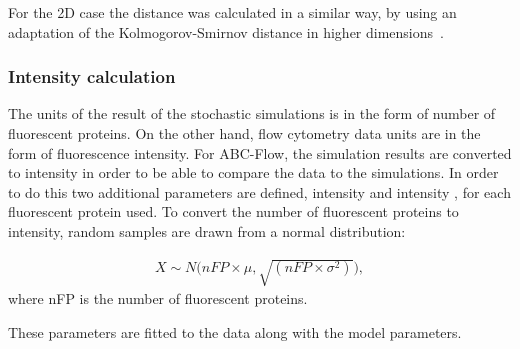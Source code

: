 

For the 2D case the distance was calculated in a similar way, by using an adaptation of the Kolmogorov-Smirnov distance in higher dimensions~\autocite{Peacock:1983fa}.

\clearpage
\subsubsection{Intensity calculation}

The units of the result of the stochastic simulations is in the form of number of fluorescent proteins. On the other hand, flow cytometry data units are in the form of fluorescence intensity. For ABC-Flow, the simulation results are converted to intensity in order to be able to compare the data to the simulations. In order to do this two additional parameters are defined, intensity \textmu{} and intensity \textsigma{}, for each fluorescent protein used. To convert the number of fluorescent proteins to intensity, random samples are drawn from a normal distribution:

\begin{align}
	X\sim N\Big(nFP\times\mu, \sqrt{(nFP\times\sigma^2)}\Big), \label{eq:intens}
\end{align}
where nFP is the number of fluorescent proteins. 


These parameters are fitted to the data along with the model parameters.  

